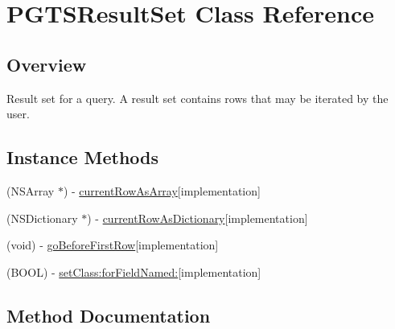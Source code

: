 \hypertarget{interface_p_g_t_s_result_set}{}\section{P\+G\+T\+S\+Result\+Set Class Reference}
\label{interface_p_g_t_s_result_set}


\subsection{Overview}
Result set for a query. A result set contains rows that may be iterated by the user. \subsection*{Instance Methods}
\begin{DoxyCompactItemize}
\item 
(N\+S\+Array $\ast$) -\/ \hyperlink{interface_p_g_t_s_result_set_a55043dd59fce289c88b686ee254a2b28}{current\+Row\+As\+Array}{\ttfamily  \mbox{[}implementation\mbox{]}}
\item 
(N\+S\+Dictionary $\ast$) -\/ \hyperlink{interface_p_g_t_s_result_set_a2b73dc783d717f3ec4ddb10d6ce13fa6}{current\+Row\+As\+Dictionary}{\ttfamily  \mbox{[}implementation\mbox{]}}
\item 
(void) -\/ \hyperlink{interface_p_g_t_s_result_set_ae1bfa20edf6712f4374d5c97f46def32}{go\+Before\+First\+Row}{\ttfamily  \mbox{[}implementation\mbox{]}}
\end{DoxyCompactItemize}
{\bf }\par
\begin{DoxyCompactItemize}
\item 
(B\+O\+O\+L) -\/ \hyperlink{interface_p_g_t_s_result_set_a8e9be7c1118f2b9dce4b422151c7017b}{set\+Class\+:for\+Field\+Named\+:}{\ttfamily  \mbox{[}implementation\mbox{]}}
\end{DoxyCompactItemize}



\subsection{Method Documentation}
\hypertarget{interface_p_g_t_s_result_set_a55043dd59fce289c88b686ee254a2b28}{}
